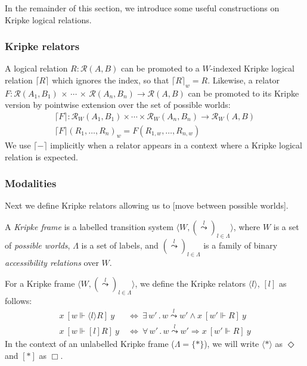 \documentclass[acmsmall,timestamp,review]{acmart}
\newcommand{\ifr}[1]{\ [{#1}]\ }
\begin{document}
In the remainder of this section,
we introduce some useful constructions on
Kripke logical relations.

\subsubsection{Kripke relators}

A logical relation $R : \mathcal{R}(A, B)$
can be promoted to a $W$-indexed Kripke logical relation $\lceil R \rceil$
which ignores the index, so that $\lceil R \rceil_w = R$.
Likewise,
a relator
  $F : \mathcal{R}(A_1, B_1) \,\times\,\cdots\,\times\,\mathcal{R}(A_n, B_n) \rightarrow \mathcal{R}(A, B)$
can be promoted to its Kripke version
by pointwise extension over the set of possible worlds:
\begin{gather*}
  \lceil F \rceil : \mathcal{R}_W(A_1, B_1) \times \cdots \times \mathcal{R}_W(A_n, B_n) \rightarrow \mathcal{R}_W(A, B) \\
  \lceil F \rceil (R_1, \ldots, R_n)_w = F(R_{1,w}, \ldots, R_{n,w})
\end{gather*}
We use $\lceil - \rceil$ implicitly
when a relator appears in a context where
a Kripke logical relation is expected.

\subsubsection{Modalities}

Next we define Kripke relators
allowing us to [move between possible worlds].

\begin{definition}
A \emph{Kripke frame}
is a labelled transition system
$\langle W, (\stackrel{l}{\leadsto})_{l \in \Lambda} \rangle$, where
$W$ is a set of \emph{possible worlds},
$\Lambda$ is a set of labels, and
$(\stackrel{l}{\leadsto})_{l \in \Lambda}$ is a family of
binary \emph{accessibility relations} over $W$.
\end{definition}

For a Kripke frame
$\langle W, (\stackrel{l}{\leadsto})_{l \in \Lambda} \rangle$,
we define the Kripke relators $\langle l \rangle$, $[l]$ as follows:
\begin{align*}
  x \ifr{w \Vdash \langle l \rangle R} y & \: \Leftrightarrow \:
    \exists \, w' \,.\, w \stackrel{l}{\leadsto} w' \wedge
      x \ifr{w' \Vdash R} y \\
  x \ifr{w \Vdash [ l ] R} y & \: \Leftrightarrow \:
    \forall \, w' \,.\, w \stackrel{l}{\leadsto} w' \Rightarrow
      x \ifr{w' \Vdash R} y
\end{align*}
In the context of an unlabelled Kripke frame ($\Lambda = \{ * \}$),
we will write $\langle * \rangle$ as $\Diamond$ and
$[ * ]$ as $\Box$.
\end{document}

